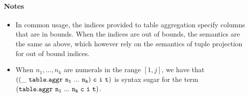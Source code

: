 \documentclass[english,a4paper,10pt]{article}
\begin{document}
\paragraph{Notes}
\begin{itemize}
\item
In common usage,
the indices provided to table aggregation specify columns that are in bounds.
When the indices are out of bounds,
the semantics are the same as above, 
which however rely on the semantics of tuple projection for out of bound indices.
\item
When $n_1, \ldots, n_k$ are numerals in the range $[1,j]$,
we have that
$\syntax{((\_\ table.aggr\ n_1\ ...\ n_k)\ c\ i\ t)}$
is syntax sugar for the term
$\syntax{(table.aggr\ n_1\ ...\ n_k\ c\ i\ t)}$.
\end{itemize}

\begin{comment}
In detail,
let $\{ t_1, \ldots, t_n \}$ be a partition of table $t$
where for each table $t_i$, each of its (tuple) elements
are identical for arguments $n_1, \ldots, n_k$.
For each $i = 1, \ldots, n$,
let $M_i$ be the bag $p(t_i)$
where $p$ is the projection operator denoted by $\syntax{(\_\ project\ n)}$.
For each such bag $M_i = \{ u_{i1}, \ldots, u_{in} \}$,
assume an arbitrary ordering over these elements $\preceq$.
Let $r_i$ be the term:
\begin{align*}
f( M_i, c( u_{in}, \ldots, c( u_{i1}, b ) \ldots ) )
\end{align*}
where $u_{i1} \preceq \ldots \preceq u_{in}$.
In other words,
$r_i$ is the result of a fold operation
starting with \emph{initial value} $b$,
applying \emph{combining function} $c$ to
the accumulated value and each of the tuples $u_{i1}, \ldots, u_{in}$,
and finally applying a \emph{finalization} function $f$
to the bag $M_i$ and to the result of the aforementioned computation.
Then,
$A( t, b, c, f)$ is
the bag union of (single argument) tuples $\{ (r_1), \ldots, (r_n) \}$.

\paragraph{Unspecified Finalize Function}
We overload the aggregation function
such that its fourth argument is optional.
If the fourth argument is not specified,
then 
$
\syntax{
((\_\ aggr\ n_1\ ...\ n_k\ n)\ t\ b\ c)
}
$
is syntax sugar for
$
\syntax{
((\_\ aggr\ n_1\ ...\ n_k\ n)\ t\ b\ c\ ident)
}
$
where $\syntax{ident}$ is the function
$\syntax{(lambda\ ((y\ (Table\ T_1 ...\ T_k))\ (x\ X_a))\ x)}$.
In other words, this function returns the result of the
fold computation described above unchanged.
\end{comment}
\end{document}
